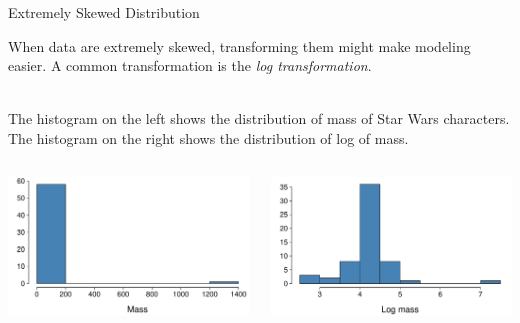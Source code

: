 \documentclass[notes,11pt, aspectratio=169]{beamer}
\newcommand{\hl}[1]{\textit{\textcolor{hlblue}{#1}}}
\begin{document}
\begin{frame}[fragile]{Extremely Skewed Distribution}

When data are extremely skewed, transforming them might make modeling easier. A common transformation is the \hl{log transformation}.

$\:$ \\
\pause
The histogram on the left shows the distribution of mass of Star Wars characters. The histogram on the right shows the distribution of log of mass.

\begin{columns}
\begin{center}
\includegraphics[scale=0.4]{graphs/l02f13a.pdf}
\end{center}

\begin{center}
\includegraphics[scale=0.4]{graphs/l02f13b.pdf}
\end{center}
\end{columns}
\end{frame}
\end{document}
